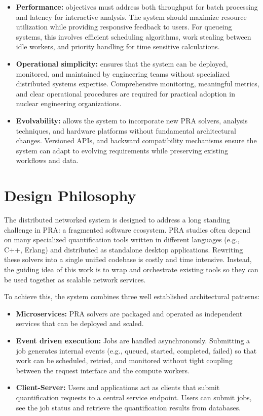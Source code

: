 \begin{itemize}
    \item \textbf{Performance:} objectives must address both throughput for batch processing and latency for interactive analysis. The system should maximize resource utilization while providing responsive feedback to users. For queueing systems, this involves efficient scheduling algorithms, work stealing between idle workers, and priority handling for time sensitive calculations.

    \item \textbf{Operational simplicity:} ensures that the system can be deployed, monitored, and maintained by engineering teams without specialized distributed systems expertise. Comprehensive monitoring, meaningful metrics, and clear operational procedures are required for practical adoption in nuclear engineering organizations.

    \item \textbf{Evolvability:} allows the system to incorporate new PRA solvers, analysis techniques, and hardware platforms without fundamental architectural changes. Versioned APIs, and backward compatibility mechanisms ensure the system can adapt to evolving requirements while preserving existing workflows and data.
\end{itemize}

\section{Design Philosophy}
The distributed networked system is designed to address a long standing challenge in PRA: a fragmented software ecosystem. PRA studies often depend on many specialized quantification tools written in different languages (e.g., C++, Erlang) and distributed as standalone desktop applications. Rewriting these solvers into a single unified codebase is costly and time intensive. Instead, the guiding idea of this work is to wrap and orchestrate existing tools so they can be used together as scalable network services.

To achieve this, the system combines three well established architectural patterns:

\begin{itemize}
    \item \textbf{Microservices:} PRA solvers are packaged and operated as independent services that can be deployed and scaled.
    \item \textbf{Event driven execution:} Jobs are handled asynchronously. Submitting a job generates internal events (e.g., queued, started, completed, failed) so that work can be scheduled, retried, and monitored without tight coupling between the request interface and the compute workers.
    \item \textbf{Client-Server:} Users and applications act as clients that submit quantification requests to a central service endpoint. Users can submit jobs, see the job status and retrieve the quantification results from databases.
\end{itemize}

